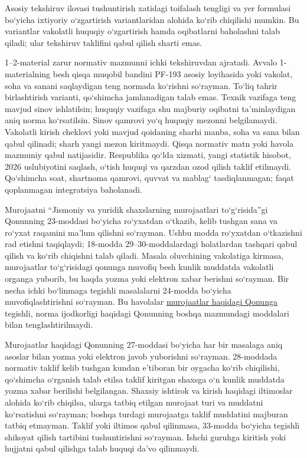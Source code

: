 \documentclass[14pt,a4paper]{extarticle}
\begin{document}
Asosiy tekshiruv ilovasi tushuntirish xatidagi toifalash tengligi va yer formulasi bo‘yicha ixtiyoriy o‘zgartirish variantlaridan alohida ko‘rib chiqilishi mumkin. Bu variantlar vakolatli huquqiy o‘zgartirish hamda oqibatlarni baholashni talab qiladi; ular tekshiruv taklifini qabul qilish sharti emas.

1–2-material zarur normativ mazmunni ichki tekshiruvdan ajratadi. Avvalo 1-materialning besh qisqa muqobil bandini PF-193 asosiy loyihasida yoki vakolat, soha va sanani saqlaydigan teng normada ko‘rishni so‘rayman. To‘liq tahrir birlashtirish varianti, qo‘shimcha jamlanadigan talab emas. Texnik vazifaga teng mavjud sinov ishlatilsin; huquqiy vazifaga shu majburiy oqibatni ta’minlaydigan aniq norma ko‘rsatilsin. Sinov qamrovi yo‘q huquqiy mezonni belgilamaydi. Vakolatli kirish cheklovi yoki mavjud qoidaning sharhi manba, soha va sana bilan qabul qilinadi; sharh yangi mezon kiritmaydi. Qisqa normativ matn yoki havola mazmuniy qabul natijasidir. Respublika qo‘lda xizmati, yangi statistik hisobot, 2026 uslubiyotini saqlash, o‘tish huquqi va qarzdan ozod qilish taklif etilmaydi. Qo‘shimcha soat, shartnoma qamrovi, quvvat va mablag‘ tasdiqlanmagan; faqat qoplanmagan integratsiya baholanadi.

Murojaatni “Jismoniy va yuridik shaxslarning murojaatlari to‘g‘risida”gi Qonunning 23-moddasi bo‘yicha ro‘yxatdan o‘tkazib, kelib tushgan sana va ro‘yxat raqamini ma’lum qilishni so‘rayman. Ushbu modda ro‘yxatdan o‘tkazishni rad etishni taqiqlaydi; 18-modda 29–30-moddalardagi holatlardan tashqari qabul qilish va ko‘rib chiqishni talab qiladi. Masala oluvchining vakolatiga kirmasa, murojaatlar to‘g‘risidagi qonunga muvofiq besh kunlik muddatda vakolatli organga yuborib, bu haqda yozma yoki elektron xabar berishni so‘rayman. Bir necha ichki bo‘linmaga tegishli masalalarni 24-modda bo‘yicha muvofiqlashtirishni so‘rayman. Bu havolalar \href{https://lex.uz/docs/-3336169}{murojaatlar haqidagi Qonunga} tegishli, norma ijodkorligi haqidagi Qonunning boshqa mazmundagi moddalari bilan tenglashtirilmaydi.

Murojaatlar haqidagi Qonunning 27-moddasi bo‘yicha har bir masalaga aniq asoslar bilan yozma yoki elektron javob yuborishni so‘rayman. 28-moddada normativ taklif kelib tushgan kundan e’tiboran bir oygacha ko‘rib chiqilishi, qo‘shimcha o‘rganish talab etilsa taklif kiritgan shaxsga o‘n kunlik muddatda yozma xabar berilishi belgilangan. Shaxsiy ishtirok va kirish haqidagi iltimoslar alohida ko‘rib chiqilsa, ularga tatbiq etilgan murojaat turi va muddatni ko‘rsatishni so‘rayman; boshqa turdagi murojaatga taklif muddatini majburan tatbiq etmayman. Taklif yoki iltimos qabul qilinmasa, 33-modda bo‘yicha tegishli shikoyat qilish tartibini tushuntirishni so‘rayman. Ishchi guruhga kiritish yoki hujjatni qabul qilishga talab huquqi da’vo qilinmaydi.
\end{document}
